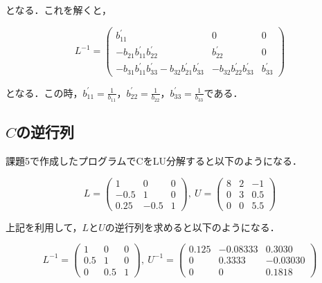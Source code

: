 \documentclass[dvipdfmx,titlepage]{jsarticle}
\begin{document}
となる．これを解くと，

\begin{equation*}
	L^{-1} = \left(
	\begin{array}{ccc}
		b_{11}^{\prime} & 0 & 0 \\
		-b_{21}b_{11}^{\prime}b_{22}^{\prime} & b_{22}^{\prime} & 0 \\
		-b_{31}b_{11}^{\prime}b_{33}^{\prime} - b_{32}b_{21}^{\prime}b_{33}^{\prime} & -b_{32}b_{22}^{\prime}b_{33}^{\prime} & b_{33}^{\prime}
	\end{array}
	\right)
\end{equation*}

となる．この時，$\displaystyle
	b_{11}^{\prime} = \frac{1}{b_{11}}，
	b_{22}^{\prime} = \frac{1}{b_{22}}，
	b_{33}^{\prime} = \frac{1}{b_{33}}$である．

\subsection*{$C$の逆行列}
課題5で作成したプログラムでCをLU分解すると以下のようになる．

\begin{equation*}
	L = \left(
	\begin{array}{ccc}
		1 & 0 & 0 \\
		-0.5 & 1 & 0 \\
		0.25 & -0.5 & 1
	\end{array}
	\right), \
	U = \left(
	\begin{array}{ccc}
		8 & 2 & -1 \\
		0 & 3 & 0.5 \\
		0 & 0 & 5.5
	\end{array}
	\right)
\end{equation*}

上記を利用して，$L$と$U$の逆行列を求めると以下のようになる．

\begin{equation*}
	L^{-1} = \left(
	\begin{array}{ccc}
		1 & 0 & 0 \\
		0.5 & 1 & 0 \\
		0 & 0.5 & 1
	\end{array}
	\right), \
	U^{-1} = \left(
	\begin{array}{ccc}
		0.125 & -0.08333 & 0.3030 \\
		0 & 0.3333 & -0.03030 \\
		0 & 0 & 0.1818
	\end{array}
	\right)
\end{equation*}
\end{document}
